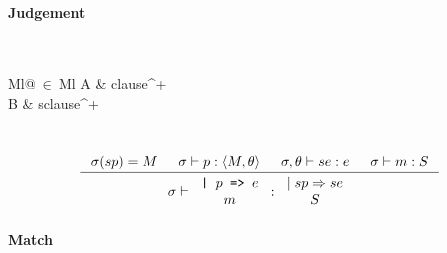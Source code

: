 \paragraph{Judgement} \\
\indent\begin{tabular}{Ml@{$\ \in\ $}Ml}
  A & clause^{+}\\
  B & sclause^{+}
\end{tabular}\\

\[
\inference
{
  \sigma(sp) = M &
  \sigma |- p : \langle M, \theta \rangle &
  \sigma, \theta |- se : e &
  \sigma |- m : S
}
{
  \sigma |-
  \begin{tabular}{c}
    \texttt{| $p$ => $e$}\\
    $m$
  \end{tabular}
  :
  \begin{tabular}{c}
    $\mid sp => se$\\
    $S$
  \end{tabular}
}
\]





\paragraph{Match}

